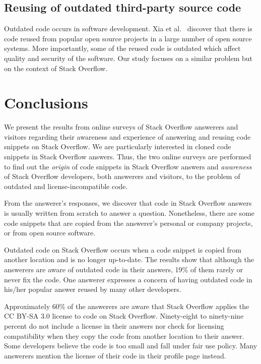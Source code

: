 \documentclass{svjour3}                     %
\begin{document}
\subsection{Reusing of outdated third-party source code} Outdated code occurs in
software development. Xia et al.~\cite{Xia2014} discover that there is code
reused from popular open source projects in a large number of open source
systems. More importantly, some of the reused code is outdated which affect
quality and security of the software. Our study focuses on a similar problem but
on the context of Stack Overflow.

\section{Conclusions}

We present the results from online surveys of Stack Overflow answerers and
visitors regarding their awareness and experience of answering and reusing code
snippets on Stack Overflow. We are particularly interested in cloned code
snippets in Stack Overflow answers. Thus, the two online surveys are performed to
find out the \textit{origin} of code snippets in Stack Overflow answers and
\textit{awareness} of Stack Overflow developers, both answerers and visitors,
to the problem of outdated and license-incompatible code.

From the answerer's responses, we discover that code in Stack Overflow answers
is usually written from scratch to answer a question. Nonetheless, there are
some code snippets that are copied from the answerer's personal or company
projects, or from open source software.

Outdated code on Stack Overflow occurs when a code snippet is
copied from another location and is no longer up-to-date. The results show that
although the answerers are aware of outdated code in their answers, 19\% of them
rarely or never fix the code. One answerer expresses a concern of having
outdated code in his/her popular answer reused
by many other developers.

Approximately 60\% of the answerers are aware that Stack Overflow
applies the CC BY-SA 3.0
license to code on Stack Overflow. Ninety-eight to ninety-nine percent
do not include a license in their answers nor check for licensing compatibility when
they copy the code from another location to their answer. Some developers
believe the code is too small and fall under fair use policy. Many answerers
mention the license of their code in their profile page instead.
\end{document}
